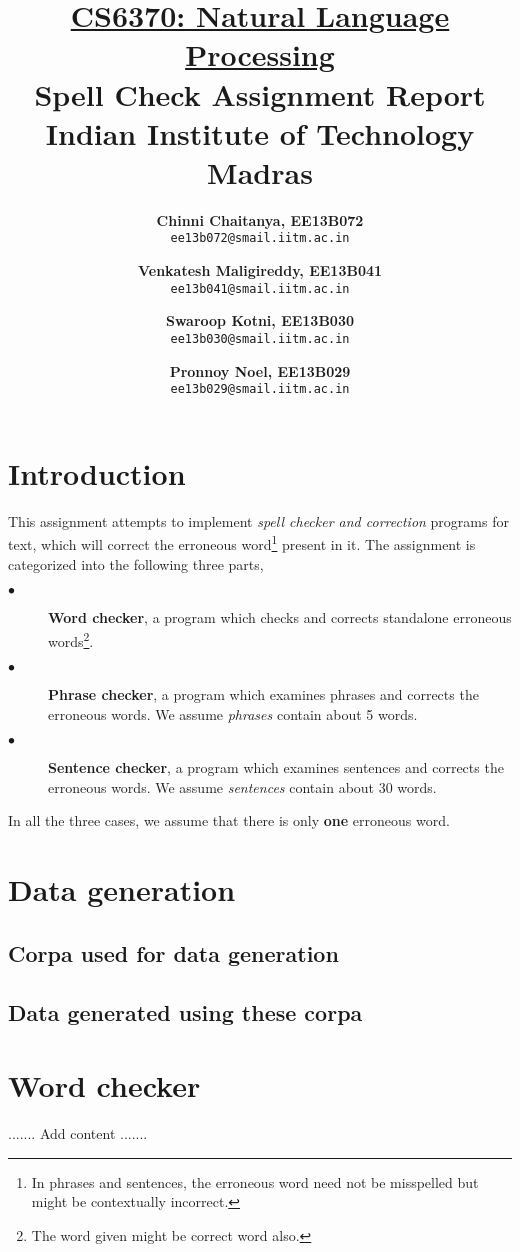 \documentclass{article}
\title{
	\underline{CS6370: Natural Language Processing}\\
	\textbf{Spell Check Assignment Report}\\
	Indian Institute of Technology Madras
}
\author{
	\textbf{Chinni Chaitanya, EE13B072}\\
	\texttt{ee13b072@smail.iitm.ac.in}	
	\and
	\textbf{Venkatesh Maligireddy, EE13B041}\\
	\texttt{ee13b041@smail.iitm.ac.in}
	\and
	\textbf{Swaroop Kotni, EE13B030}\\
	\texttt{ee13b030@smail.iitm.ac.in}
	\and
	\textbf{Pronnoy Noel, EE13B029}\\
	\texttt{ee13b029@smail.iitm.ac.in}
}
\begin{document}
	\maketitle
	\newpage
	
	\tableofcontents
	\newpage
	
	\section{Introduction}
		This assignment attempts to implement \textit{spell checker and correction} programs for text, which will correct the erroneous word\footnote{In phrases and sentences, the erroneous word need not be misspelled but might be contextually incorrect.} present in it. The assignment is categorized into the following three parts,
		\begin{description}
			\item[$\bullet$] \textbf{Word checker}, a program which checks and corrects standalone erroneous words\footnote{The word given might be correct word also.}.
			\item[$\bullet$] \textbf{Phrase checker}, a program which examines phrases and corrects the erroneous words. We assume \textit{phrases} contain about 5 words.
			\item[$\bullet$] \textbf{Sentence checker}, a program which examines sentences and corrects the erroneous words. We assume \textit{sentences} contain about 30 words.
		\end{description}
		In all the three cases, we assume that there is only \textbf{one} erroneous word.
		
	\section{Data generation}
		\subsection{Corpa used for data generation}
			
		\subsection{Data generated using these corpa}
			
	\section{Word checker}
		....... Add content .......
		
\end{document}
